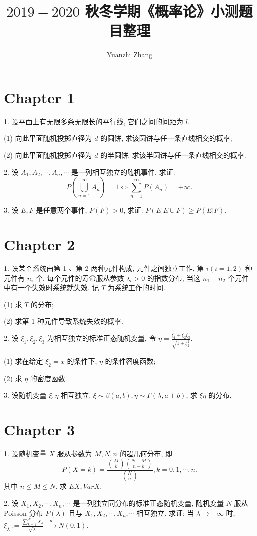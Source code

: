 \documentclass[UTF8]{ctexart}
\title{\textbf{$2019-2020$ 秋冬学期《概率论》小测题目整理}}
\author{Yuanzhi Zhang}
\date{}
\begin{document}
\maketitle
\section*{Chapter 1}
1. 设平面上有无限多条无限长的平行线, 它们之间的间距为 $l$.

(1) 向此平面随机投掷直径为 $d$ 的圆饼, 求该圆饼与任一条直线相交的概率;

(2) 向此平面随机投掷直径为 $d$ 的半圆饼, 求该半圆饼与任一条直线相交的概率.

2. 设 $A_1,A_2,\cdots,A_n,\cdots$ 是一列相互独立的随机事件, 求证:
\[
P\left(\bigcup_{n=1}^{\infty}A_n\right)=1\Leftrightarrow\sum_{n=1}^{\infty}P(A_n)=+\infty.
\]

3. 设 $E,F$ 是任意两个事件, $P(F)>0$, 求证: $P\left(E\left|E\cup F\right)\right.\geq P\left(E\left|F\right)\right.$.

\section*{Chapter 2}
1. 设某个系统由第 1 、第 2 两种元件构成, 元件之间独立工作, 第 $i(i=1,2)$ 种元件有 $n_i$ 个, 每个元件的寿命服从参数 $\lambda_i>0$ 的指数分布, 当这 $n_1+n_2$ 个元件中有一个失效时系统就失效. 记 $T$ 为系统工作的时间.

(1) 求 $T$ 的分布;

(2) 求第 1 种元件导致系统失效的概率.

2. 设 $\xi_1,\xi_2,\xi_3$ 为相互独立的标准正态随机变量, 令 $\eta=\displaystyle\frac{\xi_1+\xi_2\xi_3}{\sqrt{1+\xi_2^2}}$.

(1) 求在给定 $\xi_2=x$ 的条件下, $\eta$ 的条件密度函数;

(2) 求 $\eta$ 的密度函数.

3. 设随机变量 $\xi,\eta$ 相互独立, $\xi\sim\beta(a,b), \eta\sim\Gamma(\lambda,a+b)$, 求 $\xi\eta$ 的分布.

\section*{Chapter 3}
1. 设随机变量 $X$ 服从参数为 $M,N,n$ 的超几何分布, 即
\[
P(X=k)=\frac{\binom{M}{k}\binom{N-M}{n-k}}{\binom{N}{n}}, k=0,1,\cdots,n.
\]其中 $n\leq M\leq N$. 求 $EX, VarX$.

2. 设 $X_1,X_2,\cdots,X_n,\cdots$ 是一列独立同分布的标准正态随机变量, 随机变量 $N$ 服从 Poisson 分布 $P(\lambda)$ 且与 $X_1,X_2,\cdots,X_n,\cdots$ 相互独立. 求证: 当 $\lambda\rightarrow+\infty$ 时, $\displaystyle\xi_{\lambda}:=\frac{\sum\limits_{k=1}^{N}X_k}{\sqrt{\lambda}}\xrightarrow{\;\;\; d \;\;\; }N(0,1)$.
\end{document}
